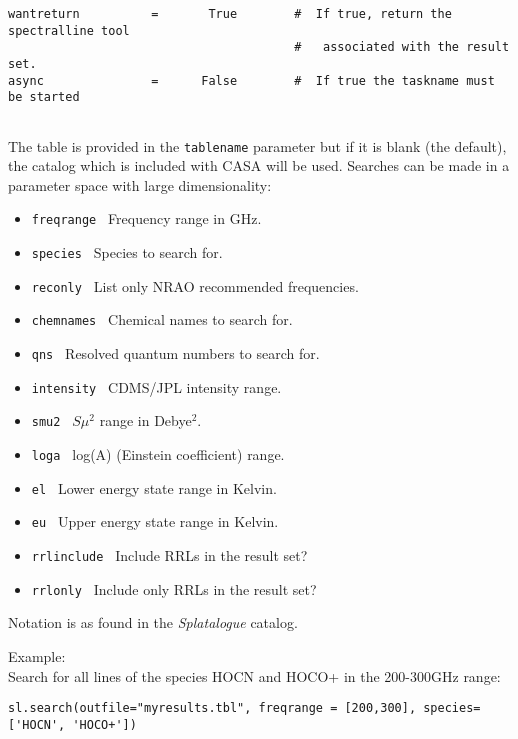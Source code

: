 \begin{verbatim}
wantreturn          =       True        #  If true, return the spectralline tool
                                        #   associated with the result set.
async               =      False        #  If true the taskname must be started
    
\end{verbatim}
\normalsize

The table is provided in the {\tt tablename} parameter but if it is
blank (the default), the catalog which is included with CASA will be
used. Searches can be made in a parameter space with large
dimensionality: 

\begin{itemize}

\item {\tt freqrange     } Frequency range in GHz.
\item {\tt species       } Species to search for.
\item {\tt reconly       } List only NRAO recommended frequencies.
\item {\tt chemnames     } Chemical names to search for.
\item {\tt qns           } Resolved quantum numbers to search for.
\item {\tt intensity     } CDMS/JPL intensity range. 
\item {\tt smu2          } $S\mu^{2}$ range in Debye$^{2}$. 
\item {\tt loga          } log(A) (Einstein coefficient) range. 
\item {\tt el            } Lower energy state range in Kelvin. 
\item {\tt eu            } Upper energy state range in Kelvin.
\item {\tt rrlinclude    } Include RRLs in the result set?
\item {\tt rrlonly       } Include only RRLs in the result set?
\end{itemize}

Notation is as found in the {\it Splatalogue} catalog. 

Example:\\
Search for all lines of the species HOCN and HOCO+ in the 200-300GHz range:
\small
\begin{verbatim}
sl.search(outfile="myresults.tbl", freqrange = [200,300], species=['HOCN', 'HOCO+'])
\end{verbatim}
\normalsize



